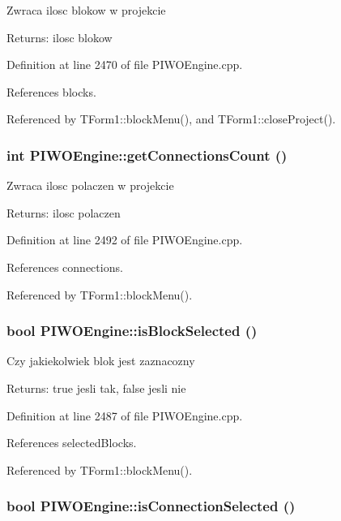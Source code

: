 Zwraca ilosc blokow w projekcie \begin{Desc}
\item[Returns:]ilosc blokow \end{Desc}


Definition at line 2470 of file PIWOEngine.cpp.

References blocks.

Referenced by TForm1::blockMenu(), and TForm1::closeProject().\hypertarget{classPIWOEngine_1c1eb9af5a92cf907bdce516de31af37}{
\subsubsection[getConnectionsCount]{\setlength{\rightskip}{0pt plus 5cm}int PIWOEngine::getConnectionsCount ()}}
\label{classPIWOEngine_1c1eb9af5a92cf907bdce516de31af37}


Zwraca ilosc polaczen w projekcie \begin{Desc}
\item[Returns:]ilosc polaczen \end{Desc}


Definition at line 2492 of file PIWOEngine.cpp.

References connections.

Referenced by TForm1::blockMenu().\hypertarget{classPIWOEngine_ff65b56ee08c0ccbdd9724ebc08dc2ad}{
\subsubsection[isBlockSelected]{\setlength{\rightskip}{0pt plus 5cm}bool PIWOEngine::isBlockSelected ()}}
\label{classPIWOEngine_ff65b56ee08c0ccbdd9724ebc08dc2ad}


Czy jakiekolwiek blok jest zaznacozny \begin{Desc}
\item[Returns:]true jesli tak, false jesli nie \end{Desc}


Definition at line 2487 of file PIWOEngine.cpp.

References selectedBlocks.

Referenced by TForm1::blockMenu().\hypertarget{classPIWOEngine_7bd61a1844a459b79a07a3ecf08d72a3}{
\subsubsection[isConnectionSelected]{\setlength{\rightskip}{0pt plus 5cm}bool PIWOEngine::isConnectionSelected ()}}
\label{classPIWOEngine_7bd61a1844a459b79a07a3ecf08d72a3}


